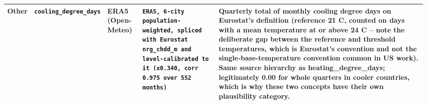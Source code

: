 \documentclass[11pt]{article}
\begin{document}
\begin{landscape}
\begin{longtable}{L{3cm} L{4cm} L{2.6cm} L{3.2cm} L{7.5cm}}
Other & \texttt{cooling\_\allowbreak{}degree\_\allowbreak{}days} & ERA5 (Open-Meteo) & \texttt{ERA5, 6-city population-weighted, spliced with Eurostat nrg\_\allowbreak{}chdd\_\allowbreak{}m and level-calibrated to it (x0.\allowbreak{}340, corr 0.\allowbreak{}975 over 552 months)} & Quarterly total of monthly cooling degree days on Eurostat's definition (reference 21 C, counted on days with a mean temperature at or above 24 C -- note the deliberate gap between the reference and threshold temperatures, which is Eurostat's convention and not the single-base-temperature convention common in US work). Same source hierarchy as heating\_degree\_days; legitimately 0.00 for whole quarters in cooler countries, which is why these two concepts have their own plausibility category. \\
\bottomrule
\end{longtable}

\end{landscape}
\end{document}
